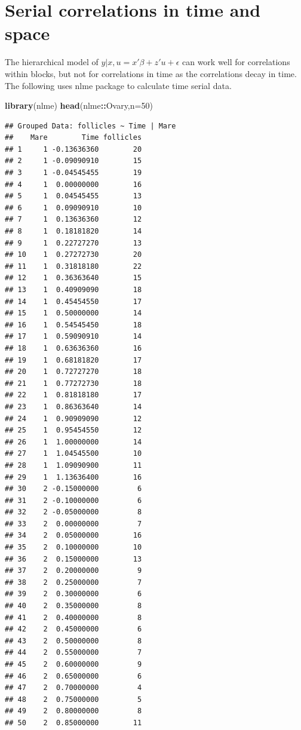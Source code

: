 \documentclass[]{book}
\newenvironment{Shaded}{\begin{snugshade}}{\end{snugshade}}
\newcommand{\KeywordTok}[1]{\textcolor[rgb]{0.13,0.29,0.53}{\textbf{#1}}}
\newcommand{\DataTypeTok}[1]{\textcolor[rgb]{0.13,0.29,0.53}{#1}}
\newcommand{\DecValTok}[1]{\textcolor[rgb]{0.00,0.00,0.81}{#1}}
\newcommand{\OperatorTok}[1]{\textcolor[rgb]{0.81,0.36,0.00}{\textbf{#1}}}
\newcommand{\NormalTok}[1]{#1}
\begin{document}
\section{Serial correlations in time and
space}\label{serial-correlations-in-time-and-space}

The hierarchical model of \(y|x, u = x'\beta+z'u+\epsilon\) can work
well for correlations within blocks, but not for correlations in time as
the correlations decay in time. The following uses nlme package to
calculate time serial data.

\begin{Shaded}
\begin{Highlighting}[]
\KeywordTok{library}\NormalTok{(nlme)}
\KeywordTok{head}\NormalTok{(nlme}\OperatorTok{::}\NormalTok{Ovary,}\DataTypeTok{n=}\DecValTok{50}\NormalTok{)}
\end{Highlighting}
\end{Shaded}

\begin{verbatim}
## Grouped Data: follicles ~ Time | Mare
##    Mare        Time follicles
## 1     1 -0.13636360        20
## 2     1 -0.09090910        15
## 3     1 -0.04545455        19
## 4     1  0.00000000        16
## 5     1  0.04545455        13
## 6     1  0.09090910        10
## 7     1  0.13636360        12
## 8     1  0.18181820        14
## 9     1  0.22727270        13
## 10    1  0.27272730        20
## 11    1  0.31818180        22
## 12    1  0.36363640        15
## 13    1  0.40909090        18
## 14    1  0.45454550        17
## 15    1  0.50000000        14
## 16    1  0.54545450        18
## 17    1  0.59090910        14
## 18    1  0.63636360        16
## 19    1  0.68181820        17
## 20    1  0.72727270        18
## 21    1  0.77272730        18
## 22    1  0.81818180        17
## 23    1  0.86363640        14
## 24    1  0.90909090        12
## 25    1  0.95454550        12
## 26    1  1.00000000        14
## 27    1  1.04545500        10
## 28    1  1.09090900        11
## 29    1  1.13636400        16
## 30    2 -0.15000000         6
## 31    2 -0.10000000         6
## 32    2 -0.05000000         8
## 33    2  0.00000000         7
## 34    2  0.05000000        16
## 35    2  0.10000000        10
## 36    2  0.15000000        13
## 37    2  0.20000000         9
## 38    2  0.25000000         7
## 39    2  0.30000000         6
## 40    2  0.35000000         8
## 41    2  0.40000000         8
## 42    2  0.45000000         6
## 43    2  0.50000000         8
## 44    2  0.55000000         7
## 45    2  0.60000000         9
## 46    2  0.65000000         6
## 47    2  0.70000000         4
## 48    2  0.75000000         5
## 49    2  0.80000000         8
## 50    2  0.85000000        11
\end{verbatim}
\end{document}

